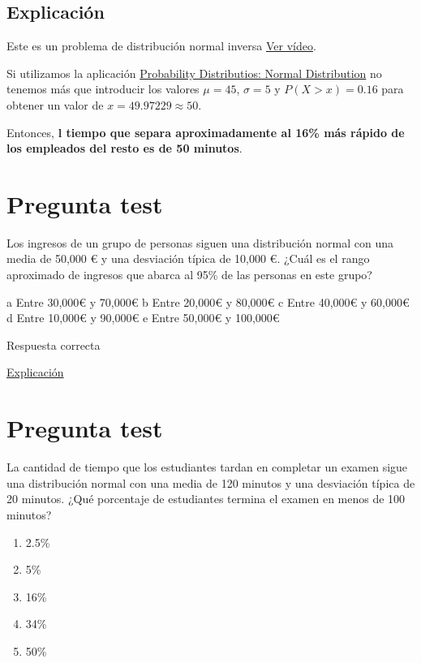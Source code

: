 \documentclass[
]{book}
\providecommand{\tightlist}{%
  \setlength{\itemsep}{0pt}\setlength{\parskip}{0pt}}
\begin{document}
\hypertarget{explicaciuxf3n}{%
\subsection{Explicación}\label{explicaciuxf3n}}

Este es un problema de distribución normal inversa \href{https://youtu.be/BqGHUqC4cdQ}{Ver vídeo}.

Si utilizamos la aplicación \href{https://homepage.divms.uiowa.edu/~mbognar/applets/normal.html}{Probability Distributios: Normal Distribution} no tenemos más que introducir los valores \(\mu = 45\), \(\sigma = 5\) y \(P(X > x)= 0.16\) para obtener un valor de \(x = 49.97229 \approx 50\).

Entonces, \textbf{l tiempo que separa aproximadamente al 16\% más rápido de los empleados del resto es de 50 minutos}.

\hypertarget{pregunta-test-115}{%
\section{Pregunta test}\label{pregunta-test-115}}

Los ingresos de un grupo de personas siguen una distribución normal con una media de 50,000 € y una desviación típica de 10,000 €. ¿Cuál es el rango aproximado de ingresos que abarca al 95\% de las personas en este grupo?

a Entre 30,000€ y 70,000€
b Entre 20,000€ y 80,000€
c Entre 40,000€ y 60,000€
d Entre 10,000€ y 90,000€
e Entre 50,000€ y 100,000€

Respuesta correcta

\href{https://youtu.be/TjZvZVxItLc}{Explicación}

\hypertarget{pregunta-test-116}{%
\section{Pregunta test}\label{pregunta-test-116}}

La cantidad de tiempo que los estudiantes tardan en completar un examen sigue una distribución normal con una media de 120 minutos y una desviación típica de 20 minutos. ¿Qué porcentaje de estudiantes termina el examen en menos de 100 minutos?

\begin{enumerate}
\def\labelenumi{\alph{enumi})}
\tightlist
\item
  2.5\%
\item
  5\%
\item
  16\%
\item
  34\%
\item
  50\%
\end{enumerate}
\end{document}
